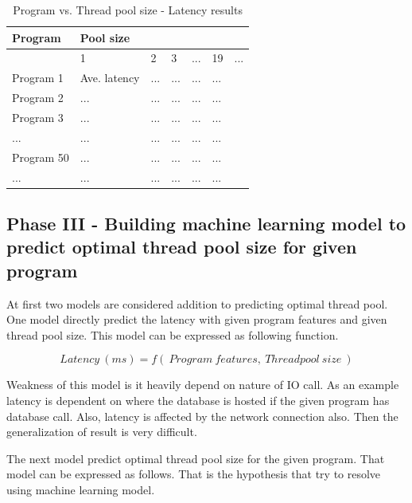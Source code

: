 \begin{table}[]
	\caption{Program vs. Thread pool size - Latency results}
	\begin{center}
	\begin{tabular}{|l|l|l|l|l|l|l|}
		\hline
		Program    & \multicolumn{6}{l|}{Pool size}        \\ \hline
		& 1            & 2 & 3 & ... & 19 & ... \\ \hline
		Program 1  & Ave. latency    & ...  & ...  & ...  &... &     \\ \hline
		Program 2  &      ...        & ...  & ...  & ...  &... &     \\ \hline
		Program 3  &      ...        & ...  & ...  & ...  &... &     \\ \hline
		...        &      ...        & ...  & ...  & ...  &... &     \\ \hline
		Program 50 &      ...        & ...  & ...  & ...  &... &     \\ \hline
		...        &      ...        & ...  & ...  & ...  &... &     \\ \hline
	\end{tabular}
	\end{center}
	\label{tab:pool_size_latency}
\end{table}

\subsection{Phase III - Building machine learning model to predict optimal thread pool size for given program}\label{sub:phase3}

At first two models are considered addition to predicting optimal thread pool. One model directly predict the latency with given program features and given thread pool size. This model can be expressed as following function. 

$$ Latency \:(ms) = f(\:Program\:features,\:Threadpool\:size\:)$$

Weakness of this model is it heavily depend on nature of IO call. As an example latency is dependent on where the database is hosted if the given program has database call. Also, latency is affected by the network connection also. Then the generalization of result is very difficult.

The next model predict optimal thread pool size for the given program. That model can be expressed as follows. That is the hypothesis that try to resolve using machine learning model. 

